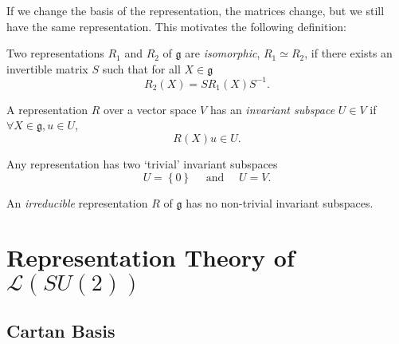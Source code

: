 If we change the basis of the representation, the matrices change, but we still have the same representation. This motivates the following definition:
\begin{definition}[]
  Two representations $R_1$ and $R_2$ of $\mathfrak{g}$ are \emph{isomorphic}, $R_1 \simeq R_2$, if there exists an invertible matrix $S$ such that for all $X \in \mathfrak{g}$
  \begin{equation}
    R_2(X) = S R_1 (X) S^{-1}.
  \end{equation}
\end{definition}
\begin{definition}[]
  A representation $R$ over a vector space $V$ has an \emph{invariant subspace} $U \in V$ if $\forall X \in \mathfrak{g}, u \in U$,
  \begin{equation}
    R(X) u \in U.
  \end{equation}
\end{definition}
\begin{example}[]
  Any representation has two `trivial' invariant subspaces
  \begin{equation}
    U= \left\{ 0 \right\} \quad \text{ and } \quad U = V.
  \end{equation}
\end{example}
\begin{definition}[]
  An \emph{irreducible} representation $R$ of $\mathfrak{g}$ has no non-trivial invariant subspaces.
\end{definition}

\section{Representation Theory of \texorpdfstring{$\mathscr{L}(SU(2))$}{the Lie Algebra of SU(2)}}%
\label{sec:representation_theory_of_texorpdfstring}

\subsection{Cartan Basis}%
\label{sub:cartan_basis}

